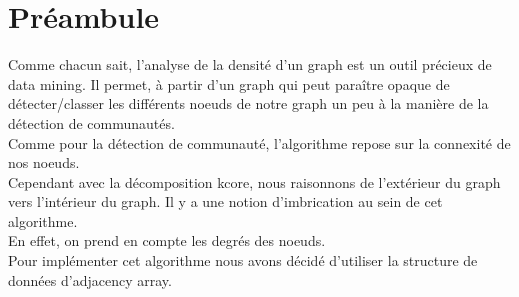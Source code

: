 \documentclass[a4paper,10pt]{report}
\begin{document}
\section{Préambule}
Comme chacun sait, l'analyse de la densité d'un graph est un outil précieux de data mining.
Il permet, à partir d'un graph qui peut paraître opaque de détecter/classer les différents noeuds de notre graph un peu à la manière de la détection de communautés. 
\\
Comme pour la détection de communauté, l'algorithme repose sur la connexité de nos noeuds.
\\
Cependant avec la décomposition kcore, nous raisonnons de l'extérieur du graph vers l'intérieur du graph. Il y a une notion d'imbrication au sein de cet algorithme.
\\
En effet, on prend en compte les degrés des noeuds.
\\
Pour implémenter cet algorithme nous avons décidé d'utiliser la structure de données d'adjacency array.
\end{document}
